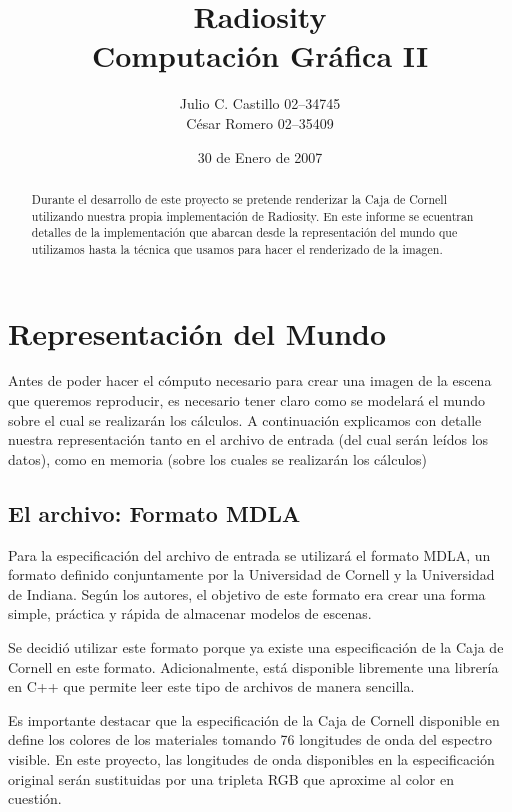 \documentclass[letterpaper]{article}
\title{{\bf Radiosity} \\ \large Computación Gráfica II}
\author{Julio C. Castillo 02--34745 \\ César Romero 02--35409}
\date{30 de Enero de 2007}
\begin{document}
\maketitle
\begin{abstract}
Durante el desarrollo de este proyecto se pretende renderizar la Caja
de Cornell\cite{cornellbox} utilizando nuestra propia implementación
de Radiosity\cite{radiosity}. En este informe se ecuentran detalles de
la implementación que abarcan desde la representación del mundo que
utilizamos hasta la técnica que usamos para hacer el renderizado de la
imagen.
\end{abstract}

\section{Representación del Mundo}
Antes de poder hacer el cómputo necesario para crear una imagen de la
escena que queremos reproducir, es necesario tener claro como se
modelará el mundo sobre el cual se realizarán los cálculos. A
continuación explicamos con detalle nuestra representación tanto en el
archivo de entrada (del cual serán leídos los datos), como en memoria
(sobre los cuales se realizarán los cálculos)

\subsection{El archivo: Formato MDLA}
\label{sec:mdla}
Para la especificación del archivo de entrada se utilizará el formato
MDLA\cite{mdla}, un formato definido conjuntamente por la Universidad
de Cornell y la Universidad de Indiana. Según los autores, el objetivo
de este formato era crear una forma simple, práctica y rápida de
almacenar modelos de escenas.

Se decidió utilizar este formato porque ya existe una especificación
de la Caja de Cornell en este formato. Adicionalmente, está disponible
libremente una librería en C++ que permite leer este tipo de archivos
de manera sencilla.

Es importante destacar que la especificación de la Caja de Cornell
disponible en~\cite{cornellboxdata} define los colores de los
materiales tomando 76 longitudes de onda del espectro visible. En este
proyecto, las longitudes de onda disponibles en la especificación
original serán sustituidas por una tripleta RGB que aproxime al color
en cuestión.
\end{document}
